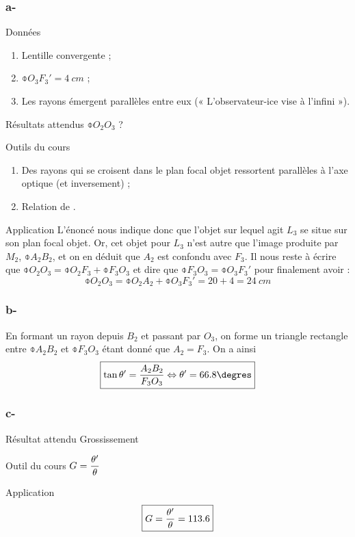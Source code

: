 \documentclass[10pt,a5paper,notitlepage]{book}
\begin{document}
\subsubsection{a-}
\begin{vtcb}{Données}
    \begin{enumerate}
        \item Lentille convergente ;
        \item $\obar{O_3F_3'} = \SI{4}{cm}$ ;
        \item Les rayons émergent parallèles entre eux (« L'observateur-ice vise
            à l'infini »).
    \end{enumerate}
\end{vtcb}

\begin{rtcb}{Résultats attendus}
    $\obar{O_2O_3}$ ?
\end{rtcb}

\begin{btcb}{Outils du cours}
    \begin{enumerate}

        \item Des rayons qui se croisent dans le plan focal objet ressortent
            parallèles à l'axe optique (et inversement) ;

        \item Relation de .
    \end{enumerate}
\end{btcb}

\begin{lgtcb}{Application}
    L'énoncé nous indique donc que l'objet sur lequel agit $L_3$ se situe sur
    son plan focal objet. Or, cet objet pour $L_3$ n'est autre que l'image
    produite par $M_2$, $\obar{A_2B_2}$, et on en déduit que $A_2$ est confondu
    avec $F_3$. Il nous reste à écrire que $\obar{O_2O_3} = \obar{O_2F_3} +
    \obar{F_3O_3}$ et dire que $\obar{F_3O_3} = \obar{O_3F_3'}$ pour finalement
    avoir :
    \[ \boxed{\obar{O_2O_3} = \obar{O_2A_2} + \obar{O_3F_3'} = 20 + 4 =
    \SI{24}{cm}} \]
\end{lgtcb}

\setcounter{subsubsection}{2}
\subsubsection{b-}
En formant un rayon depuis $B_2$ et passant par $O_3$, on forme un triangle
rectangle entre $\obar{A_2B_2}$ et $ \obar{F_3O_3}$ étant donné que $A_2 = F_3$.
On a ainsi \[ \boxed{\tan\t' = \frac{A_2B_2}{F_3O_3} \Leftrightarrow \t' =
66.8\degres}\]

\setcounter{subsubsection}{2}
\subsubsection{c-}
\begin{rtcb}{Résultat attendu}
    Grossissement
\end{rtcb}

\begin{btcb}{Outil du cours}
    $ \displaystyle G = \frac{\theta'}{\theta}$
\end{btcb}

\begin{lgtcb}{Application}
    \[ \boxed{G = \frac{\theta'}{\theta} = 113.6} \]
\end{lgtcb}
\end{document}

